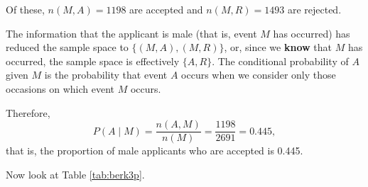 \documentclass[
  british,
]{book}
\begin{document}
\FloatBarrier

Of these, \(n(M , A) = 1198\) are accepted and \(n(M , R) = 1493\) are rejected.

The information that the applicant is male (that is, event \(M\) has occurred) has reduced the sample space to \(\{(M , A),(M , R)\}\), or, since we \textbf{know} that
\(M\) has occurred, the sample space is effectively \(\{A,R\}\). The conditional probability of \(A\) given \(M\) is the probability that event \(A\) occurs when we consider only those occasions on which event \(M\) occurs.

Therefore,
\begin{equation}
P(A \mid M) = \frac{n(A, M)}{n(M)} = \frac{1198}{2691} = 0.445,
\label{eq:freqs}
\end{equation}
that is, the proportion of male applicants who are accepted is 0.445.

Now look at Table \ref{tab:berk3p}.

 
  \providecommand{\huxb}[2]{\arrayrulecolor[RGB]{#1}\global\arrayrulewidth=#2pt}
  \providecommand{\huxvb}[2]{\color[RGB]{#1}\vrule width #2pt}
  \providecommand{\huxtpad}[1]{\rule{0pt}{#1}}
  \providecommand{\huxbpad}[1]{\rule[-#1]{0pt}{#1}}
\end{document}
